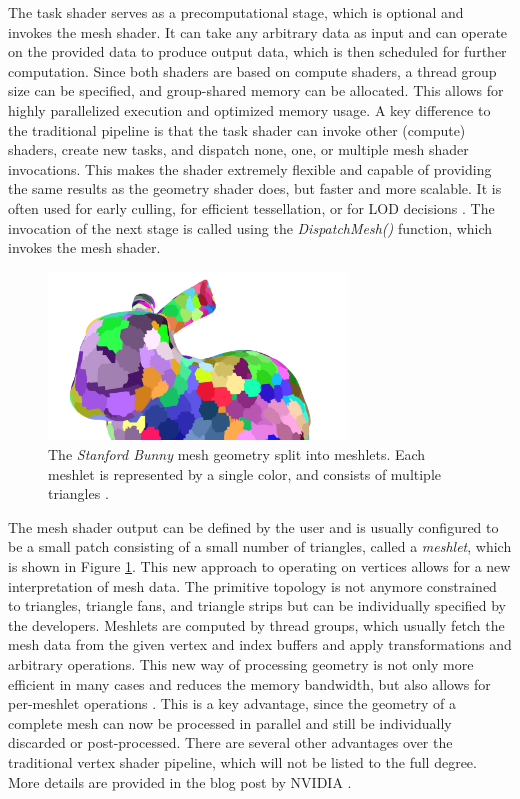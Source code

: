 \noindent
The task shader serves as a precomputational stage, which is optional and invokes the mesh shader. It can 
take any arbitrary data as input and can operate on the provided data to produce output data, which is then 
scheduled for further computation. Since both shaders are based on compute shaders, a thread group size can 
be specified, and group-shared memory can be allocated. This allows for highly parallelized execution and 
optimized memory usage. A key difference to the traditional pipeline is that the task shader can invoke other 
(compute) shaders, create new tasks, and dispatch none, one, or multiple mesh shader invocations. This makes 
the shader extremely flexible and capable of providing the same results as the geometry shader does, but 
faster and more scalable. It is often used for early culling, for efficient tessellation, or for \ac{LOD} 
decisions \cite{Kubisch2018}. The invocation of the next stage is called using the \emph{DispatchMesh()} 
function, which invokes the mesh shader. \\

\begin{figure}[h]
    \centering
    \includegraphics[width=300px]{images/graphics/bunny-meshlet.jpg}
    \caption{The \emph{Stanford Bunny} mesh geometry split into meshlets. Each meshlet is represented by a single color, 
    and consists of multiple triangles \cite{Oberberger2024}.}
    \label{fig:bunny-meshlet}
\end{figure}

\noindent
The mesh shader output can be defined by the user and is usually configured to be a small patch consisting of a small 
number of triangles, called a \emph{meshlet}, which is shown in Figure \ref{fig:bunny-meshlet}. This new approach 
to operating on vertices allows for a new interpretation of mesh data. The primitive topology is not anymore constrained 
to triangles, triangle fans, and triangle strips but can be individually specified by the developers.
Meshlets are computed by thread groups, which usually fetch the mesh data from the given vertex and index buffers and 
apply transformations and arbitrary operations. This new way of processing geometry is not only more efficient in many 
cases and reduces the memory bandwidth, but also allows for per-meshlet operations \cite{Kubisch2020}. This is a key 
advantage, since the geometry of a complete mesh can now be processed in parallel and still be individually discarded 
or post-processed. There are several other advantages over the traditional vertex shader pipeline, which will not be 
listed to the full degree. More details are provided in the blog post by NVIDIA \cite{Kubisch2020}.\\


